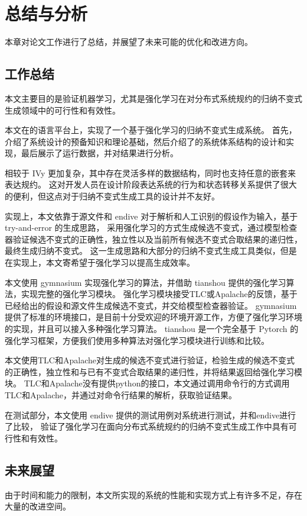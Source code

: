 \chapter{总结与分析}\label{chap:conclusion}
本章对论文工作进行了总结，并展望了未来可能的优化和改进方向。
\section{工作总结}
本文主要目的是验证机器学习，尤其是强化学习在对分布式系统规约的归纳不变式生成领域中的可行性和有效性。

本文在\TLA 的语言平台上，实现了一个基于强化学习的归纳不变式生成系统。
首先，介绍了系统设计的预备知识和理论基础，然后介绍了\rltla 的系统体系结构的设计和实现，最后展示了运行数据，并对结果进行分析。

\TLA 相较于 IVy 更加复杂，其中存在灵活多样的数据结构，同时也支持任意的嵌套来表达规约。
这对开发人员在设计阶段表达系统的行为和状态转移关系提供了很大的便利，但这点对于归纳不变式生成工具的设计并不友好。

实现上，本文依靠于\TLA 源文件和 endive 对于\TLA 解析和人工识别的假设作为输入，基于 try-and-error 的生成思路，
采用强化学习的方式生成候选不变式，通过模型检查器验证候选不变式的正确性，独立性以及当前所有候选不变式合取结果的递归性，最终生成归纳不变式。
这一生成思路和大部分的归纳不变式生成工具类似，但是在实现上，本文寄希望于强化学习以提高生成效率。

本文使用 gymnasium 实现强化学习的算法，并借助 tianshou 提供的强化学习算法，实现完整的强化学习模块。
强化学习模块接受TLC或Apalache的反馈，基于已经给出的假设和\TLA 源文件生成候选不变式，并交给模型检查器验证。
gymnasium 提供了标准的环境接口，是目前十分受欢迎的环境开源工作，方便了强化学习环境的实现，并且可以接入多种强化学习算法。
tianshou 是一个完全基于 Pytorch 的强化学习框架，方便我们使用多种算法对强化学习模块进行训练和比较。

本文使用TLC和Apalache对生成的候选不变式进行验证，检验生成的候选不变式的正确性，独立性和与已有不变式合取结果的递归性，并将结果返回给强化学习模块。
TLC和Apalache没有提供python的接口，本文通过调用命令行的方式调用TLC和Apalache，并通过对命令行结果的解析，获取验证结果。

在测试部分，本文使用 endive 提供的测试用例对系统进行测试，并和endive进行了比较，
验证了强化学习在面向分布式系统规约的归纳不变式生成工作中具有可行性和有效性。

\section{未来展望}
由于时间和能力的限制，本文所实现的系统的性能和实现方式上有许多不足，存在大量的改进空间。

